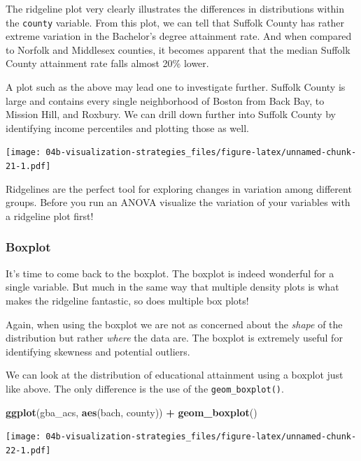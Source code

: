 \documentclass[
]{book}
\newenvironment{Shaded}{\begin{snugshade}}{\end{snugshade}}
\newcommand{\KeywordTok}[1]{\textcolor[rgb]{0.13,0.29,0.53}{\textbf{#1}}}
\newcommand{\NormalTok}[1]{#1}
\newcommand{\OperatorTok}[1]{\textcolor[rgb]{0.81,0.36,0.00}{\textbf{#1}}}
\newcommand{\StringTok}[1]{\textcolor[rgb]{0.31,0.60,0.02}{#1}}
\begin{document}
The ridgeline plot very clearly illustrates the differences in distributions within the \texttt{county} variable. From this plot, we can tell that Suffolk County has rather extreme variation in the Bachelor's degree attainment rate. And when compared to Norfolk and Middlesex counties, it becomes apparent that the median Suffolk County attainment rate falls almost 20\% lower.

A plot such as the above may lead one to investigate further. Suffolk County is large and contains every single neighborhood of Boston from Back Bay, to Mission Hill, and Roxbury. We can drill down further into Suffolk County by identifying income percentiles and plotting those as well.

\texttt{[image: 04b-visualization-strategies\_files/figure-latex/unnamed-chunk-21-1.pdf]}

Ridgelines are the perfect tool for exploring changes in variation among different groups. Before you run an ANOVA visualize the variation of your variables with a ridgeline plot first!

\hypertarget{boxplot}{%
\subsubsection{Boxplot}\label{boxplot}}

It's time to come back to the boxplot. The boxplot is indeed wonderful for a single variable. But much in the same way that multiple density plots is what makes the ridgeline fantastic, so does multiple box plots!

Again, when using the boxplot we are not as concerned about the \emph{shape} of the distribution but rather \emph{where} the data are. The boxplot is extremely useful for identifying skewness and potential outliers.

We can look at the distribution of educational attainment using a boxplot just like above. The only difference is the use of the \texttt{geom\_boxplot()}.

\begin{Shaded}
\begin{Highlighting}[]
\KeywordTok{ggplot}\NormalTok{(gba\_acs, }\KeywordTok{aes}\NormalTok{(bach, county)) }\OperatorTok{+}
\StringTok{  }\KeywordTok{geom\_boxplot}\NormalTok{()}
\end{Highlighting}
\end{Shaded}

\texttt{[image: 04b-visualization-strategies\_files/figure-latex/unnamed-chunk-22-1.pdf]}
\end{document}
